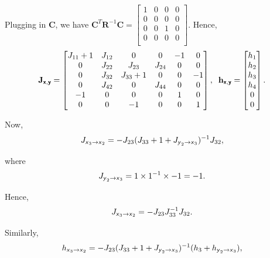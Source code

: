 \documentclass{article}
\newcommand{\s}[1]{\textsf{\textit{#1}}}
\newcommand{\bs}[1]{\textsf{\textbf{#1}}}
\newcommand{\bm}{\mathbf}
\begin{document}
Plugging in $\bm{C}$, we have $\bm{C}^T\bm{R}^{-1}\bm{C} = 
\begin{bmatrix}
    1 & 0 & 0 & 0 \\
    0 & 0 & 0 & 0 \\
    0 & 0 & 1 & 0 \\
    0 & 0 & 0 & 0 \\
\end{bmatrix}$. Hence, 
\begin{align*}
\bm{J}_{\bs{x}, \bs{y}} =
\begin{bmatrix}
    J_{11} + 1 & J_{12} & 0 & 0 & -1 & 0\\
    0 & J_{22} & J_{23} & J_{24} & 0 & 0 \\
    0 & J_{32} & J_{33} + 1 & 0 & 0 & -1 \\
    0 & J_{42} & 0 & J_{44} & 0 & 0 \\
    -1 & 0 & 0 & 0 & 1 & 0 \\
    0 & 0 & -1 & 0 & 0 & 1
\end{bmatrix}, \;\;
\bm{h}_{\bs{x}, \bs{y}} = 
\begin{bmatrix}
    h_1 \\
    h_2 \\
    h_3 \\
    h_4 \\
    0 \\
    0\\
\end{bmatrix}.
\end{align*}

Now,
\begin{align*}
	J_{\s{x}_3\to\s{x}_2} &= -J_{23}(J_{33} + 1 + J_{\s{y}_2\to\s{x}_3})^{-1}J_{32},\\
\end{align*}

where 
\begin{align*}
	J_{\s{y}_2\to\s{x}_3} &= 1\times1^{-1}\times -1 = -1.\\
\end{align*}

Hence, 
\begin{align*}
	J_{\s{x}_3\to\s{x}_2} &= -J_{23}J_{33}^{-1}J_{32}.\\
\end{align*}

Similarly,
\begin{align*}
	h_{\s{x}_3\to\s{x}_2} &= -J_{23}(J_{33} + 1 + J_{\s{y}_2\to\s{x}_3})^{-1}(h_3+h_{\s{y}_2\to\s{x}_3}),\\
\end{align*}
\end{document}
